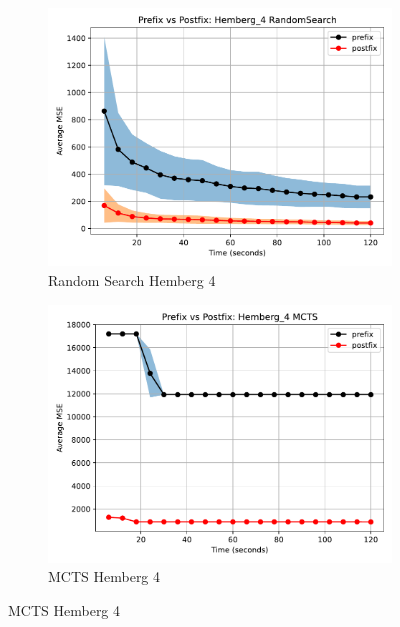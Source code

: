 \documentclass[runningheads]{llncs}
\begin{document}
\begin{figure}
    \centering
    
    \begin{subfigure}[b]{0.4\textwidth}
        \includegraphics[width=\linewidth, keepaspectratio]{Hemberg_Benchmarks/PrePostHemberg_4RandomSearch.pdf}
        \caption{Random Search Hemberg 4}
        \label{subfig:hemberg_4_RS}
    \end{subfigure}
    \begin{subfigure}[b]{0.4\textwidth}
        \includegraphics[width=\linewidth, keepaspectratio]{Hemberg_Benchmarks/PrePostHemberg_4MCTS.pdf}
        \caption{MCTS Hemberg 4}
        \label{subfig:hemberg_4_MCTS}
    \end{subfigure}
    

\end{figure}
\end{document}
